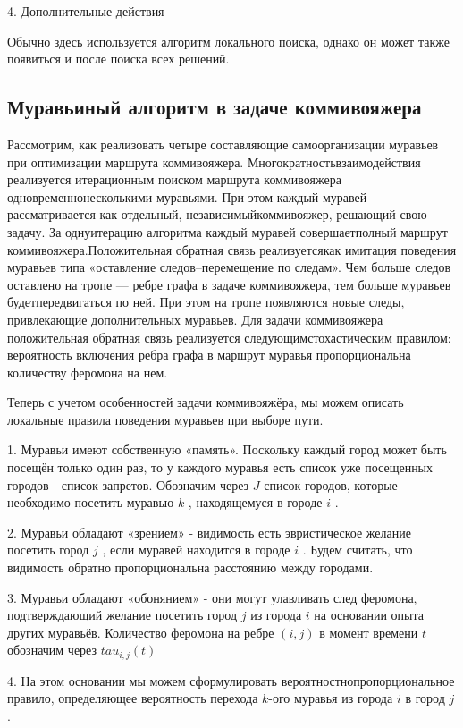 \documentclass[a4paper, 14pt]{article}
\begin{document}
4. Дополнительные действия 

 Обычно здесь используется алгоритм локального поиска, однако    он может также появиться и после поиска всех решений. 

		\subsection{Муравьиный алгоритм в задаче коммивояжера}
		Рассмотрим, как реализовать четыре составляющие самоорганизации муравьев при оптимизации маршрута коммивояжера. Многократностьвзаимодействия реализуется итерационным поиском маршрута коммивояжера одновременнонесколькими муравьями. При этом каждый муравей рассматривается как отдельный, независимыйкоммивояжер, решающий свою задачу. За однуитерацию алгоритма каждый муравей совершаетполный маршрут коммивояжера.Положительная обратная связь реализуетсякак имитация поведения муравьев типа «оставление следов–перемещение по следам». Чем больше следов оставлено на тропе — ребре графа в задаче коммивояжера, тем больше муравьев будетпередвигаться по ней. При этом на тропе появляются новые следы, привлекающие дополнительных муравьев. Для задачи коммивояжера положительная обратная связь реализуется следующимстохастическим правилом: вероятность включения ребра графа в маршрут муравья пропорциональна количеству феромона на нем.
		
		Теперь с учетом особенностей задачи коммивояжёра, мы можем описать локальные правила поведения муравьев при выборе пути.\
		
	1. Муравьи имеют собственную «память». Поскольку каждый город может быть посещён только один раз, то у каждого муравья есть список уже посещенных городов - список запретов. Обозначим через $J$ список городов, которые необходимо посетить муравью $k$ , находящемуся в городе $i$ . 
	
	2. Муравьи обладают «зрением» - видимость есть эвристическое желание посетить город $j$ , если муравей находится в городе $i$ . Будем считать, что видимость обратно пропорциональна расстоянию между городами. 
	
	3. Муравьи обладают «обонянием» - они могут улавливать след феромона, подтверждающий желание посетить город $j$ из города $i$ на основании опыта других муравьёв. Количество феромона на ребре $(i,j)$ в момент времени $t$ обозначим через  $tau _{i,j} (t)$ 
	
	 4. На этом основании мы можем сформулировать вероятностнопропорциональное правило, определяющее вероятность перехода $k$-ого муравья из города $i$  в город $j$. 
	 
\end{document}

